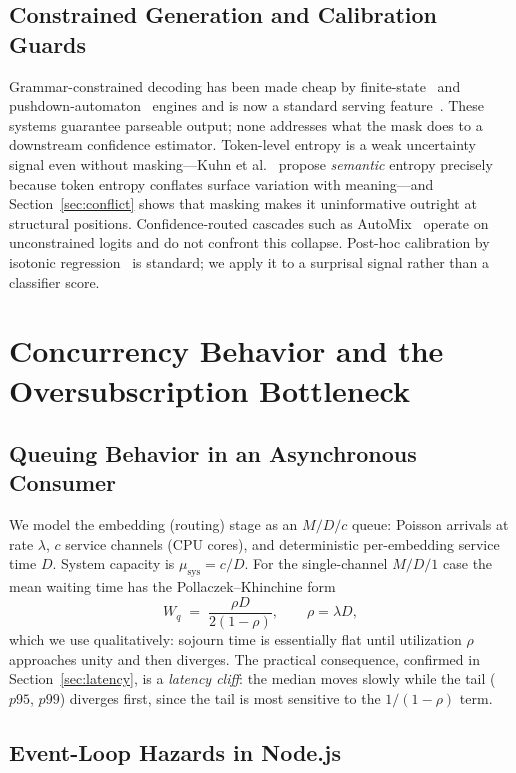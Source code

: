 \documentclass[conference]{IEEEtran}
\begin{document}
\subsection{Constrained Generation and Calibration Guards}
Grammar-constrained decoding has been made cheap by finite-state~\cite{outlines} and pushdown-automaton~\cite{xgrammar} engines and is now a standard serving feature~\cite{sglang}. These systems guarantee parseable output; none addresses what the mask does to a downstream confidence estimator. Token-level entropy is a weak uncertainty signal even without masking---Kuhn et al.~\cite{kuhn2023semantic} propose \emph{semantic} entropy precisely because token entropy conflates surface variation with meaning---and Section~\ref{sec:conflict} shows that masking makes it uninformative outright at structural positions. Confidence-routed cascades such as AutoMix~\cite{automix} operate on unconstrained logits and do not confront this collapse. Post-hoc calibration by isotonic regression~\cite{zadrozny} is standard; we apply it to a surprisal signal rather than a classifier score.

\section{Concurrency Behavior and the Oversubscription Bottleneck}

\subsection{Queuing Behavior in an Asynchronous Consumer}
\label{sec:queue}

We model the embedding (routing) stage as an $M/D/c$ queue: Poisson arrivals at rate $\lambda$, $c$ service channels (CPU cores), and deterministic per-embedding service time $D$. System capacity is $\mu_{\text{sys}} = c/D$. For the single-channel $M/D/1$ case the mean waiting time has the Pollaczek--Khinchine form~\cite{kleinrock}
\begin{equation}
W_q \;=\; \frac{\rho D}{2(1-\rho)}, \qquad \rho = \lambda D,
\label{eq:pk}
\end{equation}
which we use qualitatively: sojourn time is essentially flat until utilization $\rho$ approaches unity and then diverges. The practical consequence, confirmed in Section~\ref{sec:latency}, is a \emph{latency cliff}: the median moves slowly while the tail ($p95$, $p99$) diverges first, since the tail is most sensitive to the $1/(1-\rho)$ term.

\subsection{Event-Loop Hazards in Node.js}
\end{document}
